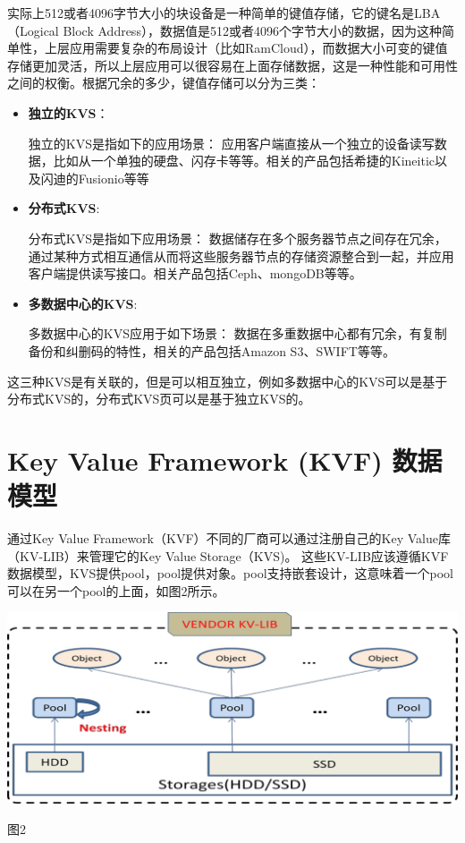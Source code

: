 		实际上512或者4096字节大小的块设备是一种简单的键值存储，它的键名是LBA（Logical Block Address），数据值是512或者4096个字节大小的数据，因为这种简单性，上层应用需要复杂的布局设计（比如RamCloud），而数据大小可变的键值存储更加灵活，所以上层应用可以很容易在上面存储数据，这是一种性能和可用性之间的权衡。根据冗余的多少，键值存储可以分为三类：
	\begin{itemize}
		\item \textbf{独立的KVS}：
		
			独立的KVS是指如下的应用场景：
			应用客户端直接从一个独立的设备读写数据，比如从一个单独的硬盘、闪存卡等等。相关的产品包括希捷的Kineitic以及闪迪的Fusionio等等

		\item \textbf{分布式KVS}:
		
			分布式KVS是指如下应用场景：
			数据储存在多个服务器节点之间存在冗余，通过某种方式相互通信从而将这些服务器节点的存储资源整合到一起，并应用客户端提供读写接口。相关产品包括Ceph、mongoDB等等。

		\item \textbf{多数据中心的KVS}:
		
			多数据中心的KVS应用于如下场景：
			数据在多重数据中心都有冗余，有复制备份和纠删码的特性，相关的产品包括Amazon S3、SWIFT等等。
	\end{itemize}

		这三种KVS是有关联的，但是可以相互独立，例如多数据中心的KVS可以是基于分布式KVS的，分布式KVS页可以是基于独立KVS的。
\section{Key Value Framework (KVF) 数据模型}\label{sec:KVF-model}
	通过Key Value Framework（KVF）不同的厂商可以通过注册自己的Key Value库（KV-LIB）来管理它的Key Value Storage（KVS)。 这些KV-LIB应该遵循KVF数据模型，KVS提供pool，pool提供对象。pool支持嵌套设计，这意味着一个pool可以在另一个pool的上面，如图2所示。
	\begin{center}
		\includegraphics[width=13.9cm]{img/figure2.pdf}
	\end{center}
	\centerline {图2}

